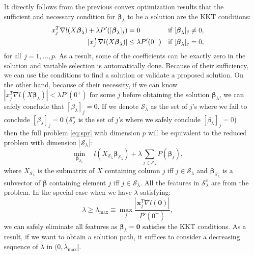 It directly follows from the previous convex optimization results that the sufficient and necessary condition for $\boldsymbol\beta_{\lambda}$ to be a solution are the KKT conditions:
\begin{align*}
    x_j^T\nabla l(X\boldsymbol\beta_\lambda)+\lambda P'([\boldsymbol \beta_\lambda]_j)&=0 &&\textnormal{if }[\boldsymbol \beta_\lambda]_j\neq 0,\\
    |x_j^T\nabla l(X\boldsymbol\beta_\lambda)|&\leq \lambda P'(0^+) &&\textnormal{if }[\boldsymbol \beta_\lambda]_j= 0,
\end{align*}
for all $j=1,...,p$. As a result, some of the coefficients can be exactly zero in the solution and variable selection is automatically done. Because of their sufficiency, we can use the conditions to find a solution or validate a proposed solution. On the other hand, because of their necessity, if we can know $|x_j^T\nabla l(X\boldsymbol\beta_\lambda)|< \lambda P'(0^+)$ for some $j$ before obtaining the solution $\boldsymbol\beta_\lambda$, we can safely conclude that $[\beta_\lambda]_j=0$. If we denote $\mathcal{S}_\lambda$ as the set of $j$'s where we fail to conclude $[\beta_\lambda]_j=0$ ($\mathcal{S}_\lambda^c$ is the set of $j$'s where we safely conclude  $[\beta_\lambda]_j=0$) then the full problem \eqref{eq:spr} with dimension $p$ will be equivalent to the reduced problem with dimension $|\mathcal{S}_\lambda|$:
\begin{equation}
    \underset{\boldsymbol\beta_{\mathcal{S}_\lambda}}{\min}\quad l(X_{\mathcal{S}_\lambda}\boldsymbol\beta_{\mathcal{S}_\lambda})+\lambda \sum_{j\in\mathcal{S}_\lambda}P(\boldsymbol\beta_j),
\end{equation}
where $X_{\mathcal{S}_\lambda}$ is the submatrix of $X$ containing column $j$ iff $j\in\mathcal{S}_\lambda$ and $\boldsymbol\beta_{\mathcal{S}_\lambda}$ is a subvector of $\boldsymbol\beta$ containing element $j$ iff $j\in\mathcal{S}_\lambda$. All the features in $\mathcal{S}_\lambda^c$ are  from the problem. In the special case when we have $\lambda$ satisfying:
\begin{equation}
    \lambda\geq\lambda_{\max}\equiv \underset{j}{\max}\frac{|\boldsymbol x_j^T\nabla l(\boldsymbol0)|}{P'(0^+)},
\end{equation}
we can safely eliminate all features as $\boldsymbol\beta_{\lambda}=\boldsymbol0$ satisfies the KKT conditions. As a result, if we want to obtain a solution path, it suffices to consider a decreasing sequence of $\lambda$ in $(0,\lambda_{\max}]$.

